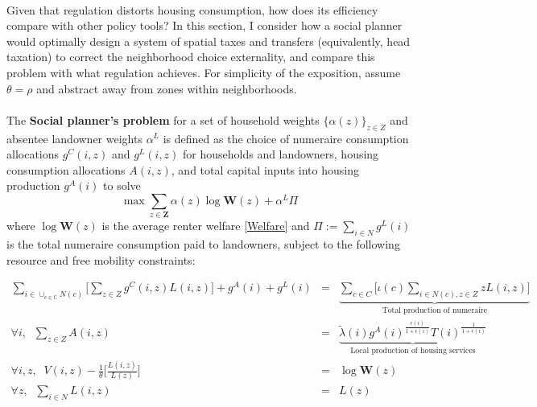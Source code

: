 \documentclass[12pt]{article}
\begin{document}
\paragraph*{}
Given that regulation distorts housing consumption, how does its efficiency compare with other policy tools? In this section, I consider how a social planner would optimally design a system of spatial taxes and transfers (equivalently, head taxation) to correct the neighborhood choice externality, and compare this problem with what regulation achieves. For simplicity of the exposition, assume $\theta = \rho$ and abstract away from zones within neighborhoods. 
\paragraph*{}
The \textbf{Social planner's problem} for a set of household weights $\{\alpha(z)\}_{z \in Z}$ and absentee landowner weights $\alpha^{L}$ is defined as the choice of numeraire consumption allocations $g^{C}(i, z)$ and $g^{L}(i, z)$ for households and landowners, housing consumption allocations $A(i, z)$, and total capital inputs into housing production $g^{A}(i)$ to solve
\begin{equation}
	\max   \sum_{z \in \boldsymbol{Z}}\alpha(z)\log \boldsymbol{W}(z) +\alpha^{L}\Pi
\end{equation}
where $\log \boldsymbol{W}(z)$ is the average renter welfare \eqref{Welfare} and $\Pi:= \sum_{i \in N}g^{L}(i)$ is the total numeraire consumption paid to landowners, subject to the following resource and free mobility constraints:

\begin{align}
	\sum_{i \in \cup_{c \in \mathbb{C}}N(c)}\big[\sum_{z \in Z}g^{C}(i, z)L(i, z)\big] + g^{A}(i) + g^{L}(i)& = & \underbrace{\sum_{c \in C}\bigg[\iota(c)\sum_{i \in N(c), z \in Z}zL(i, z) \bigg]}_{\text{Total production of numeraire}} \label{OptPolicy:BalancedGBudget} \\
	\forall i, \; \; \sum_{z \in Z}A(i, z) & = & \underbrace{\tilde{\lambda}(i)g^{A}(i)^{\frac{\epsilon(i)}{1 + \epsilon(i)}}T(i)^{\frac{1}{1 + \epsilon(i)}}}_{\text{Local production of housing services}} \label{OptPolicy:BalancedHBudget} \\
	\forall i, z,	\; \; V(i, z) - \frac{1}{\theta}\bigg[\frac{L(i, z)}{L(z)}\bigg]	 & = & \log \boldsymbol{W}(z) \label{OptPolicy:FreeMobility} 	\\
	\forall z,	\; \;\sum_{i \in N}L(i, z) & = & L(z)	
\end{align}
\end{document}
